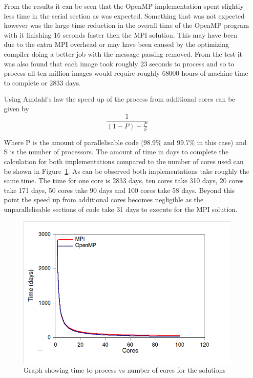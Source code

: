 From the results it can be seen that the OpenMP implementation spent slightly less time in the serial section as was expected. Something that was not expected however was the large time reduction in the overall time of the OpenMP program with it finishing 16 seconds faster then the MPI solution. This may have been due to the extra MPI overhead or may have been caused by the optimizing compiler doing a better job with the message passing removed. From the test it was also found that each image took roughly 23 seconds to process and so to process all ten million images would require roughly 68000 hours of machine time to complete or 2833 days.

Using Amdahl's law \cite{am} the speed up of the process from additional cores can be given by
\[
 \frac{1}{(1-P) + \frac{P}{S}}
\]

Where P is the amount of parallelisable code (98.9\% and 99.7\% in this case) and S is the number of processors. The amount of time in days to complete the calculation for both implementations compared to the number of cores used can be shown in Figure~\ref{mpi-time-cores}. As can be observed both implementations take roughly the same time. The time for one core is 2833 days, ten cores take 310 days, 20 cores take 171 days, 50 cores take 90 days and 100 cores take 58 days. Beyond this point the speed up from additional cores becomes negligible as the unparallelisable sections of code take 31 days to execute for the MPI solution. 

\begin{figure}[ht]
	\begin{center}
		\includegraphics[width=1.0\textwidth]{mpi-time-cores}
	\end{center}
	\caption{Graph showing time to process vs number of cores for the solutions}
	\label{mpi-time-cores}
\end{figure}

